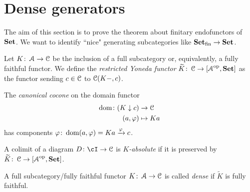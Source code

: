 \documentclass[a4paper,11pt,oneside,openany]{scrbook}
\begin{document}
\section{Dense generators}
The aim of this section is to prove the theorem about finitary endofunctors of ${\normalfont\textbf{Set}}$. We want to identify ``nice" generating subcategories like ${\normalfont\textbf{Set}}_\text{fin}\to{\normalfont\textbf{Set}}$.
\begin{defn}
	Let $K\colon\operatorname{\mathcal{A}}\to\operatorname{\mathcal{C}}$ be the inclusion of a full subcategory or, equivalently, a fully faithful functor. We define the \emph{restricted Yoneda functor} $\widetilde{K}\colon\operatorname{\mathcal{C}}\to\left[\operatorname{\mathcal{A}}^{\operatorname{\text{op}}},{\normalfont\textbf{Set}}\right]$ as the functor sending $c\in\operatorname{\mathcal{C}}$ to $\operatorname{\mathcal{C}}(K-,c)$.
\end{defn}
The \emph{canonical cocone} on the domain functor
\begin{align*}
	\operatorname{dom}\colon(K\downarrow c) & \to\operatorname{\mathcal{C}}      \\
	(a,\varphi)               & \mapsto Ka
\end{align*}
has components $\varphi\colon\operatorname{dom}(a,\varphi)=Ka\xrightarrow{\varphi}c$.
\begin{defn}
	A colimit of a diagram $D\colon\cI\to\C$ is \emph{$K$-absolute} if it is preserved by $\widetilde{K}\colon\operatorname{\mathcal{C}}\to\left[\operatorname{\mathcal{A}}^{\operatorname{\text{op}}},{\normalfont\textbf{Set}}\right]$.
\end{defn}
\begin{defn}
	A full subcategory/fully faithful functor $K\colon\operatorname{\mathcal{A}}\to\operatorname{\mathcal{C}}$ is called \emph{dense} if $\widetilde{K}$ is fully faithful.
\end{defn}
\end{document}
